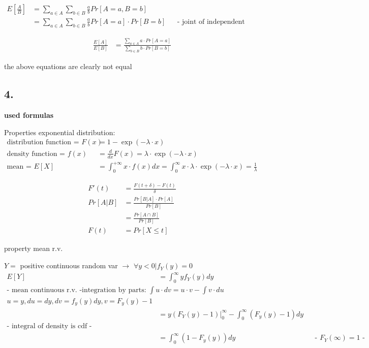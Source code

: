 \begin{align*}
E\left[\frac{A}{B}\right]&=\sum_{{a\in A}}\sum_{{b\in B}}\frac{a}{b}Pr\left[A=a,B=b\right]\\
&=\sum_{{a\in A}}\sum_{{b\in B}}\frac{a}{b}Pr\left[A=a\right]\cdot Pr\left[B=b\right]&& \text{- joint of independent vars -}
\end{align*}

\begin{align*}
\frac{E\left[A\right]}{E\left[B\right]}&=\frac{\sum_{{a\in A}}a\cdot Pr\left[A=a\right]}{\sum_{{b\in B}}b\cdot Pr\left[B=b\right]}
\end{align*}

the above equations are clearly not equal

\subsection*{4. }

\textbf{used formulas}

Properties exponential distribution:
\begin{align*}
\text{distribution function = } F\left(x\right)&=1-\exp\left(-\lambda\cdot x\right)\\
\text{density function = } f\left(x\right)&=\frac{d}{dx}F\left(x\right)=\lambda\cdot \exp\left(-\lambda\cdot x\right)\\
\text{mean = } E\left[X\right]&=\int_{0}^{{+\infty}}x\cdot f\left(x\right)dx=\int_{0}^{\infty}x\cdot \lambda\cdot \exp\left(-\lambda\cdot x\right)=\frac{1}{\lambda}
\end{align*}

\begin{align*}
F\prime \left(t\right) &= \frac{F\left(t+\delta \right)-F\left(t\right)}{\delta }\\
Pr\left[A|B\right]&=\frac{Pr\left[B|A\right]\cdot Pr\left[A\right]}{Pr\left[B\right]}\\
&=\frac{Pr\left[A\cap B\right]}{Pr\left[B\right]}\\
F(t) &= Pr[X \le t]
\end{align*}

property mean r.v.

$Y=$ positive continuous random var $\rightarrow$ $\forall y< 0|f_{Y}\left(y\right)=0$
\begin{align*}
E\left[Y\right]&=\int _{0}^{\infty }yf_{Y}\left(y\right)dy&& \\\text{-  mean continuous r.v. -}
\text{integration by parts: $\int u \cdot dv = u \cdot v - \int v \cdot du$}\\
\text{$u = y, du = dy, dv = f_y(y)dy, v = F_y(y)-1$}\\
&=y\left(F_{Y}\left(y\right)-1\right)\bigg\rvert _{0}^{\infty }-\int _{0}^{\infty }\left(F_{y}\left(y\right)-1\right)dy&& \\\text{- integral of density is cdf -}\\
&=\int _{0}^{\infty }\left(1-F_{y}\left(y\right)\right)dy&& \text{-  $F_{Y}\left(\infty \right)=1$ -}
\end{align*}

